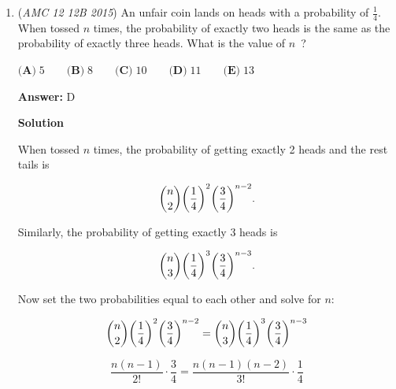 \begin{enumerate}
 $\textbf{(A)}\; 18 \qquad\textbf{(B)}\; 162 \qquad\textbf{(C)}\; 36\sqrt{21} \qquad\textbf{(D)}\; 18\sqrt{138} \qquad\textbf{(E)}\; 54\sqrt{21}$

 \textbf{Answer: }C



\textbf{Solution}

The distance from a corner to the center is 6, and from the corner to the top of the pyramid is 8, so the height is $\sqrt{8^2 - 6^2} = \sqrt{64 - 36} = \sqrt{28} = 2\sqrt{7}$.

 The area of the hexagon is

 
 \[\frac{3\sqrt{3}}{2} \cdot (\text{side})^2 = \frac{3\sqrt{3}}{2} \cdot 6^2 = 54\sqrt{3}\]

 Thus, the volume of the pyramid is 

 
 \[\frac{1}{3} \times \text{base} \times \text{height} = \frac{ 54\sqrt{3} \cdot 2\sqrt{7}}{3} = \boxed{\textbf{(C)}\; 36\sqrt{21}}\].

 


	\item (\textit{AMC 12 12B 2015}) An unfair coin lands on heads with a probability of $\frac{1}{4}$. When tossed $n$ times, the probability of exactly two heads is the same as the probability of exactly three heads. What is the value of $n$ ?


 $\textbf{(A)}\; 5 \qquad\textbf{(B)}\; 8 \qquad\textbf{(C)}\; 10 \qquad\textbf{(D)}\; 11 \qquad\textbf{(E)}\; 13$

 \textbf{Answer: }D



\textbf{Solution}

When tossed $n$ times, the probability of getting exactly 2 heads and the rest tails is

 
 \[\dbinom{n}{2} {\left( \frac{1}{4} \right)}^2 {\left( \frac{3}{4} \right) }^{n-2}.\]

 Similarly, the probability of getting exactly 3 heads is

 
 \[\dbinom{n}{3}{\left( \frac{1}{4} \right)}^3 {\left( \frac{3}{4} \right) }^{n-3}.\]

 Now set the two probabilities equal to each other and solve for $n$:

 
 \[\dbinom{n}{2}{\left( \frac{1}{4} \right)}^2 {\left( \frac{3}{4} \right) }^{n-2}=\dbinom{n}{3}{\left( \frac{1}{4} \right)}^3 {\left( \frac{3}{4} \right) }^{n-3}\]

 \[\frac{n(n-1)}{2!} \cdot \frac{3}{4} = \frac{n(n-1)(n-2)}{3!}  \cdot \frac{1}{4}\]


\end{enumerate}
